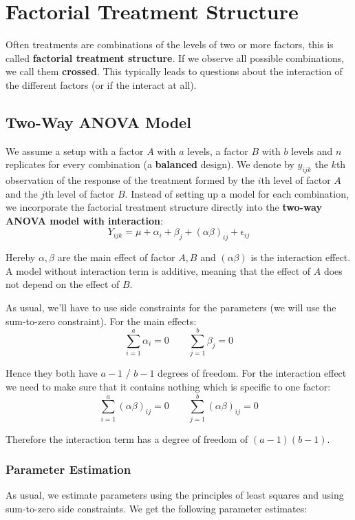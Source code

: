 \section{Factorial Treatment Structure}

Often treatments are combinations of the levels of two or more factors, this is called \textbf{factorial treatment structure}. If we observe all possible combinations, we call them \textbf{crossed}. This typically leads to questions about the interaction of the different factors (or if the interact at all).


\subsection{Two-Way ANOVA Model}

We assume a setup with a factor $A$ with $a$ levels, a factor $B$ with $b$ levels and $n$ replicates for every combination (a \textbf{balanced} design). We denote by $y_{ijk}$ the $k$th observation of the response of the treatment formed by the $i$th level of factor $A$ and the $j$th level of factor $B$. Instead of setting up a model for each combination, we incorporate the factorial treatment structure directly into the \textbf{two-way ANOVA model with interaction}:
$$Y_{ijk} = \mu + \alpha_i + \beta_j + (\alpha \beta)_{ij} + \epsilon_{ij}$$

Hereby $\alpha, \beta$ are the main effect of factor $A, B$ and $(\alpha \beta)$ is the interaction effect. A model without interaction term is additive, meaning that the effect of $A$ does not depend on the effect of $B$.\medskip

As usual, we'll have to use side constraints for the parameters (we will use the sum-to-zero constraint). For the main effects:
$$\sum_{i=1}^a \alpha_i = 0 \qquad \sum_{j=1}^b \beta_j = 0 $$

Hence they both have $a-1$ / $b-1$ degrees of freedom. For the interaction effect we need to make sure that it contains nothing which is specific to one factor:
$$\sum_{i=1}^a (\alpha \beta)_{ij} = 0 \qquad \sum_{j=1}^b (\alpha \beta)_{ij} = 0$$

Therefore the interaction term has a degree of freedom of $(a-1)(b-1)$.

\subsubsection{Parameter Estimation}

As usual, we estimate parameters using the principles of least squares and using sum-to-zero side constraints. We get the following parameter estimates:

